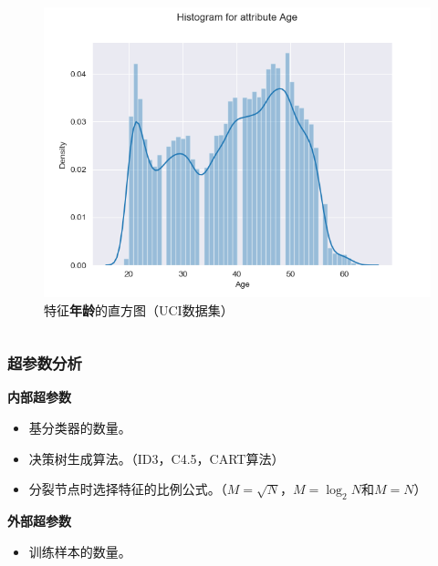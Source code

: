 \documentclass[10pt,aspectratio=43,mathserif]{beamer}
\begin{document}
\begin{frame}
\begin{columns}
                \begin{figure}
                    \centering
                    \includegraphics[width=1\textwidth]{figures/dis_Age.png}
                    \caption{特征\textbf{年龄}的直方图（UCI数据集）}
                \end{figure}
            \end{columns}
		\end{frame}

        \begin{frame}
		  \frametitle{\textbf{超参数分析}}
            \begin{block}{\textbf{内部超参数}}
                \begin{itemize}
                    \item 基分类器的数量。
                    \item 决策树生成算法。（ID3，C4.5，CART算法）
                    \item 分裂节点时选择特征的比例公式。（$M=\sqrt{N}$，$M=\log _{2}{N}$和$M=N$）
                \end{itemize}
            \end{block}

            \begin{block}{\textbf{外部超参数}}
                \begin{itemize}
                    \item 训练样本的数量。
                \end{itemize}
            \end{block}
		\end{frame}
\end{document}
